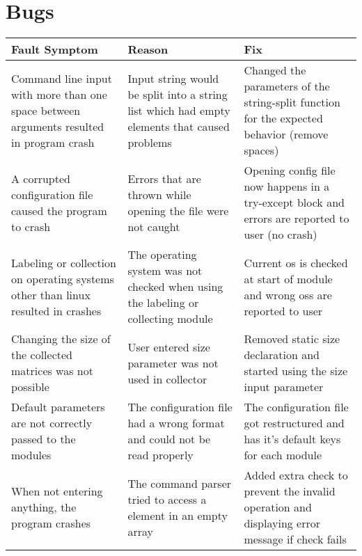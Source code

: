 \documentclass[parskip=full]{scrartcl}
\begin{document}
\section{Bugs}
\begin{tabular}{|p{4.5cm}|p{4.5cm}|p{4.5cm}|}

\hline

 Fault Symptom  & Reason & Fix  \\

\hline

Command line input with more than one space between arguments resulted in program crash &
Input string would be split into a string list which had empty elements that caused problems &
Changed the parameters of the string-split function for the expected behavior (remove spaces) \\

\hline

A corrupted configuration file caused the program to crash &
Errors that are thrown while opening the file were not caught &
Opening config file now happens in a try-except block and errors are reported to user (no crash) \\

\hline

Labeling or collection on operating systems other than linux resulted in crashes &
The operating system was not checked when using the labeling or collecting module &
Current \gls{os} is checked at start of module and wrong \glspl{os} are reported to user \\

\hline

Changing the size of the collected matrices was not possible &
User entered size parameter was not used in collector &
Removed static size declaration and started using the size input parameter \\

\hline

Default parameters are not correctly passed to the modules &
The configuration file had a wrong format and could not be read properly &
The configuration file got restructured and has it's default keys for each module \\

\hline

When not entering anything, the program crashes &
The command parser tried to access a element in an empty array &
Added extra check to prevent the invalid operation and displaying error message if check fails \\


\end{tabular}
\end{document}
